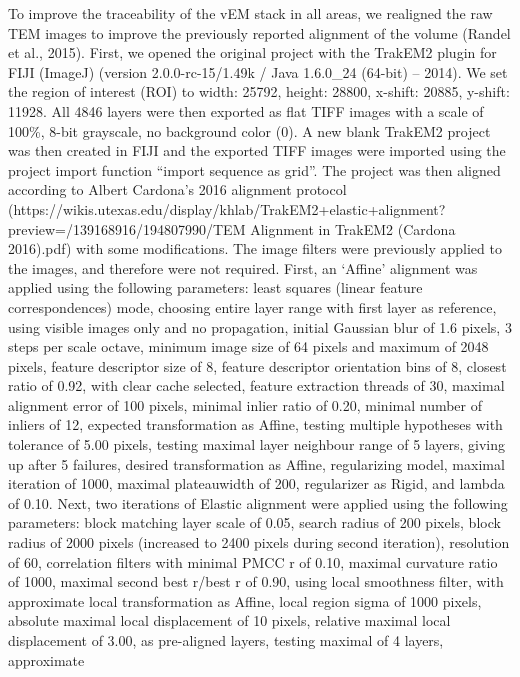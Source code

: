 \documentclass[
  11pt,
]{article}
\begin{document}
To improve the traceability of the vEM stack in all areas, we realigned
the raw TEM images to improve the previously reported alignment of the
volume (Randel et al., 2015). First, we opened the original project with
the TrakEM2 plugin for FIJI (ImageJ) (version 2.0.0-rc-15/1.49k / Java
1.6.0\_24 (64-bit) -- 2014). We set the region of interest (ROI) to
width: 25792, height: 28800, x-shift: 20885, y-shift: 11928. All 4846
layers were then exported as flat TIFF images with a scale of 100\%,
8-bit grayscale, no background color (0). A new blank TrakEM2 project
was then created in FIJI and the exported TIFF images were imported
using the project import function ``import sequence as grid''. The
project was then aligned according to Albert Cardona's 2016 alignment
protocol
(https://wikis.utexas.edu/display/khlab/TrakEM2+elastic+alignment?preview=/139168916/194807990/TEM
Alignment in TrakEM2 (Cardona 2016).pdf) with some modifications. The
image filters were previously applied to the images, and therefore were
not required. First, an `Affine' alignment was applied using the
following parameters: least squares (linear feature correspondences)
mode, choosing entire layer range with first layer as reference, using
visible images only and no propagation, initial Gaussian blur of 1.6
pixels, 3 steps per scale octave, minimum image size of 64 pixels and
maximum of 2048 pixels, feature descriptor size of 8, feature descriptor
orientation bins of 8, closest ratio of 0.92, with clear cache selected,
feature extraction threads of 30, maximal alignment error of 100 pixels,
minimal inlier ratio of 0.20, minimal number of inliers of 12, expected
transformation as Affine, testing multiple hypotheses with tolerance of
5.00 pixels, testing maximal layer neighbour range of 5 layers, giving
up after 5 failures, desired transformation as Affine, regularizing
model, maximal iteration of 1000, maximal plateauwidth of 200,
regularizer as Rigid, and lambda of 0.10. Next, two iterations of
Elastic alignment were applied using the following parameters: block
matching layer scale of 0.05, search radius of 200 pixels, block radius
of 2000 pixels (increased to 2400 pixels during second iteration),
resolution of 60, correlation filters with minimal PMCC r of 0.10,
maximal curvature ratio of 1000, maximal second best r/best r of 0.90,
using local smoothness filter, with approximate local transformation as
Affine, local region sigma of 1000 pixels, absolute maximal local
displacement of 10 pixels, relative maximal local displacement of 3.00,
as pre-aligned layers, testing maximal of 4 layers, approximate
\end{document}
